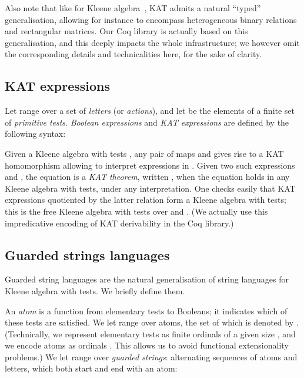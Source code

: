 \documentclass[a4paper]{llncs}
\begin{document}
Also note that like for Kleene
algebra~\cite{kozen98:ka:typed,pous:csl10:utas,bp:itp10:kacoq}, KAT
admits a natural ``typed'' generalisation, allowing for instance to
encompass heterogeneous binary relations and rectangular matrices. Our
Coq library is actually based on this generalisation, and this deeply
impacts the whole infrastructure; we however omit the corresponding
details and technicalities here, for the sake of clarity.




\subsection{KAT expressions}
\label{ssec:syntactic:model}

Let  range over a set  of \emph{letters} (or
\emph{actions}), and let  be the elements of a finite
set  of \emph{primitive tests}. \emph{Boolean expressions} and
\emph{KAT expressions} are defined by the following syntax:

Given a Kleene algebra with tests ,
any pair of maps  and  gives
rise to a KAT homomorphism allowing to interpret expressions in
.
Given two such expressions  and , the equation  is a
\emph{KAT theorem}, written , when the equation holds
in any Kleene algebra with tests, under any interpretation. One checks
easily that KAT expressions quotiented by the latter relation form a
Kleene algebra with tests; this is the free Kleene algebra with tests
over  and . (We actually use this impredicative
encoding of KAT derivability in the Coq library.)




\subsection{Guarded strings languages}
\label{ssec:gsl:model}

Guarded string languages are the natural generalisation of string
languages for Kleene algebra with tests. We briefly define them.

An \emph{atom} is a function from elementary tests  to
Booleans; it indicates which of these tests are satisfied. We let
 range over atoms, the set of which is denoted by .
(Technically, we represent elementary tests as finite ordinals of a
given size  , and we encode atoms as
ordinals . This allows us to avoid functional
extensionality problems.) We let  range over \emph{guarded
  strings}: alternating sequences of atoms and letters, which both start and end
with an atom:
\end{document}
